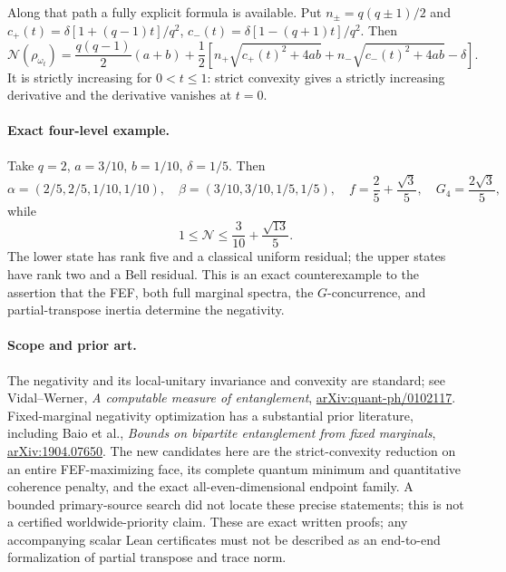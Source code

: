 Along that path a fully explicit formula is available. Put
$n_\pm=q(q\pm1)/2$ and
$c_+(t)=\delta[1+(q-1)t]/q^2$,
$c_-(t)=\delta[1-(q+1)t]/q^2$. Then
\[
 \mathcal N(\rho_{\omega_t})=
 \frac{q(q-1)}2(a+b)+\frac12\left[
 n_+\sqrt{c_+(t)^2+4ab}+n_-\sqrt{c_-(t)^2+4ab}-\delta\right].
\]
It is strictly increasing for $0<t\le1$: strict convexity gives a strictly
increasing derivative and the derivative vanishes at $t=0$.

\paragraph{Exact four-level example.}
Take $q=2$, $a=3/10$, $b=1/10$, $\delta=1/5$. Then
\[
 \alpha=(2/5,2/5,1/10,1/10),\quad
 \beta=(3/10,3/10,1/5,1/5),\quad
 f=\frac25+\frac{\sqrt3}{5},\quad G_4=\frac{2\sqrt3}{5},
\]
while
\[
 \boxed{\quad 1\le\mathcal N\le\frac3{10}+\frac{\sqrt{13}}5.\quad}
\]
The lower state has rank five and a classical uniform residual; the upper
states have rank two and a Bell residual. This is an exact counterexample
to the assertion that the FEF, both full marginal spectra, the
$G$-concurrence, and partial-transpose inertia determine the negativity.

\paragraph{Scope and prior art.}
The negativity and its local-unitary invariance and convexity are standard;
see Vidal--Werner, \emph{A computable measure of entanglement},
\href{https://arxiv.org/abs/quant-ph/0102117}{arXiv:quant-ph/0102117}.
Fixed-marginal negativity optimization has a substantial prior literature,
including Baio et al., \emph{Bounds on bipartite entanglement from fixed
marginals}, \href{https://arxiv.org/abs/1904.07650}{arXiv:1904.07650}.
The new candidates here are the strict-convexity reduction on an entire
FEF-maximizing face, its complete quantum minimum and quantitative
coherence penalty, and the exact all-even-dimensional endpoint family.
A bounded primary-source search did not locate these precise statements;
this is not a certified worldwide-priority claim. These are exact written
proofs; any accompanying scalar Lean certificates must not be described
as an end-to-end formalization of partial transpose and trace norm.
